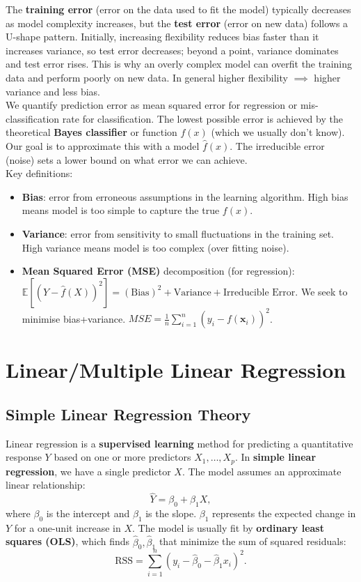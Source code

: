 \documentclass[11pt]{article}
\begin{document}
\noindent The \textbf{training error} (error on the data used to fit the model) typically decreases as model complexity increases, but the \textbf{test error} (error on new data) follows a U-shape pattern. Initially, increasing flexibility reduces bias faster than it increases variance, so test error decreases; beyond a point, variance dominates and test error rises. This is why an overly complex model can overfit the training data and perform poorly on new data. In general higher flexibility $\implies$ higher variance and less bias. \\

\noindent We quantify prediction error as mean squared error for regression or mis-classification rate for classification. The lowest possible error is achieved by the theoretical \textbf{Bayes classifier} or function $f(x)$ (which we usually don't know). Our goal is to approximate this with a model $\hat f(x)$. The irreducible error (noise) sets a lower bound on what error we can achieve. \\

\noindent Key definitions:
\begin{itemize}
  \item \textbf{Bias}: error from erroneous assumptions in the learning algorithm. High bias means model is too simple to capture the true $f(x)$.
  \item \textbf{Variance}: error from sensitivity to small fluctuations in the training set. High variance means model is too complex (over fitting noise).
  \item \textbf{Mean Squared Error (MSE)} decomposition (for regression): $\mathbb{E}[ (Y - \hat f(X))^2 ] = (\text{Bias})^2 + \text{Variance} + \text{Irreducible Error}$. We seek to minimise bias+variance. $MSE = \frac{1}{n}\sum_{i=1}^{n}(y_i - \hat{f(\boldsymbol{x}_i)})^2$.
\end{itemize}

\newpage

\section{Linear/Multiple Linear Regression}
\subsection{Simple Linear Regression Theory}
Linear regression is a \textbf{supervised learning} method for predicting a quantitative response $Y$ based on one or more predictors $X_1,\ldots,X_p$. In \textbf{simple linear regression}, we have a single predictor $X$. The model assumes an approximate linear relationship:
\[ \hat Y = \beta_0 + \beta_1 X, \]
where $\beta_0$ is the intercept and $\beta_1$ is the slope. $\beta_1$ represents the expected change in $Y$ for a one-unit increase in $X$. The model is usually fit by \textbf{ordinary least squares (OLS)}, which finds $\hat\beta_0, \hat\beta_1$ that minimize the sum of squared residuals:
\[ \text{RSS} = \sum_{i=1}^n (y_i - \hat\beta_0 - \hat\beta_1 x_i)^2. \]
\end{document}
